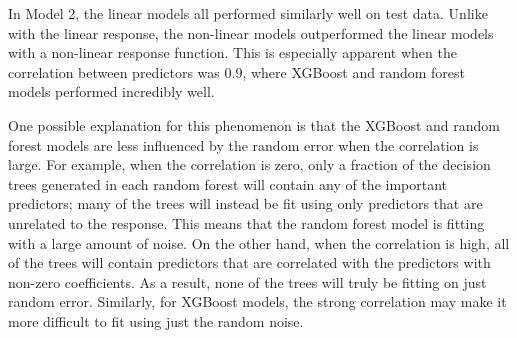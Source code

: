 \documentclass{article}
\begin{document}
	In Model 2, the linear models all performed similarly well on test data. Unlike with the linear response, the non-linear models outperformed the linear models with a non-linear response function. This is especially apparent when the correlation between predictors was 0.9, where XGBoost and random forest models performed incredibly well.
	
	One possible explanation for this phenomenon is that the XGBoost and random forest models are less influenced by the random error when the correlation is large. For example, when the correlation is zero, only a fraction of the decision trees generated in each random forest will contain any of the important predictors; many of the trees will instead be fit using only predictors that are unrelated to the response. This means that the random forest model is fitting with a large amount of noise. On the other hand, when the correlation is high, all of the trees will contain predictors that are correlated with the  predictors with non-zero coefficients. As a result, none of the trees will truly be fitting on just random error. Similarly, for XGBoost models, the strong correlation may make it more difficult to fit using just the random noise.
	

	

	
\end{document}
